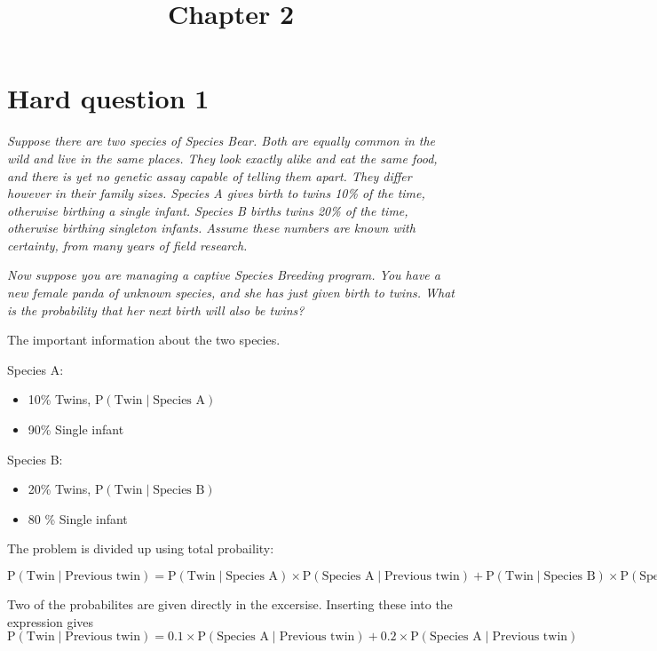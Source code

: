 \documentclass[]{article}
\title{Chapter 2}
\author{}
\date{}
\providecommand{\tightlist}{%
  \setlength{\itemsep}{0pt}\setlength{\parskip}{0pt}}
\begin{document}
\maketitle

\section{Hard question 1}\label{hard-question-1}

\emph{Suppose there are two species of Species Bear. Both are equally
common in the wild and live in the same places. They look exactly alike
and eat the same food, and there is yet no genetic assay capable of
telling them apart. They differ however in their family sizes. Species A
gives birth to twins 10\% of the time, otherwise birthing a single
infant. Species B births twins 20\% of the time, otherwise birthing
singleton infants. Assume these numbers are known with certainty, from
many years of field research.}

\emph{Now suppose you are managing a captive Species Breeding program.
You have a new female panda of unknown species, and she has just given
birth to twins. What is the probability that her next birth will also be
twins?}

The important information about the two species.

Species A:

\begin{itemize}
\tightlist
\item
  10\% Twins, \(\textrm{P}(\textrm{Twin} \mid \textrm{Species A})\)
\item
  90\% Single infant
\end{itemize}

Species B:

\begin{itemize}
\tightlist
\item
  20\% Twins, \(\textrm{P}(\textrm{Twin} \mid \textrm{Species B})\)
\item
  80 \% Single infant
\end{itemize}

The problem is divided up using total probaility:

\[  \textrm{P}(\textrm{Twin} \mid \textrm{Previous twin})  =  \textrm{P}(\textrm{Twin} \mid \textrm{Species A}) \times \textrm{P}(\textrm{Species A} \mid \textrm{Previous twin}) + \textrm{P}(\textrm{Twin} \mid \textrm{Species B}) \times \textrm{P}(\textrm{Species A} \mid \textrm{Previous twin}) \]

Two of the probabilites are given directly in the excersise. Inserting
these into the expression gives
\[  \textrm{P}(\textrm{Twin} \mid \textrm{Previous twin})  =  0.1 \times\textrm{P}(\textrm{Species A} \mid \textrm{Previous twin}) + 0.2 \times \textrm{P}(\textrm{Species A} \mid \textrm{Previous twin}) \]
\end{document}
